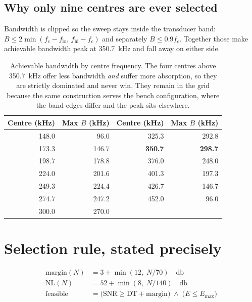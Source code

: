 \documentclass[11pt,a4paper]{article}
\begin{document}
\subsection{Why only nine centres are ever selected}

Bandwidth is clipped so the sweep stays inside the transducer band:
$B \leq 2\min(f_c - f_{\text{lo}},\, f_{\text{hi}} - f_c)$ and separately
$B \leq 0.9 f_c$. Together those make achievable bandwidth peak at
\SI{350.7}{\kilo\hertz} and fall away on either side.

\begin{table}[htbp]
\centering
\small
\begin{tabular}{rr rr}
\toprule
\textbf{Centre (kHz)} & \textbf{Max $B$ (kHz)} & \textbf{Centre (kHz)} & \textbf{Max $B$ (kHz)} \\
\midrule
148.0 & 96.0 & 325.3 & 292.8 \\
173.3 & 146.7 & \textbf{350.7} & \textbf{298.7} \\
198.7 & 178.8 & 376.0 & 248.0 \\
224.0 & 201.6 & 401.3 & 197.3 \\
249.3 & 224.4 & 426.7 & 146.7 \\
274.7 & 247.2 & 452.0 & 96.0 \\
300.0 & 270.0 & & \\
\bottomrule
\end{tabular}
\caption{Achievable bandwidth by centre frequency. The four centres above
\SI{350.7}{\kilo\hertz} offer less bandwidth \emph{and} suffer more absorption,
so they are strictly dominated and never win. They remain in the grid because
the same construction serves the bench configuration, where the band edges
differ and the peak sits elsewhere.}
\end{table}

\section{Selection rule, stated precisely}

\begin{equation*}
\begin{aligned}
\text{margin}(N) &= 3 + \min(12,\; N/70) \quad \si{\decibel} \\
\text{NL}(N) &= 52 + \min(8,\; N/140) \quad \si{\decibel} \\
\text{feasible} &= \bigl(\mathrm{SNR} \geq \mathrm{DT} + \text{margin}\bigr)
   \;\wedge\; \bigl(E \leq E_{\max}\bigr)
\end{aligned}
\end{equation*}
\end{document}
